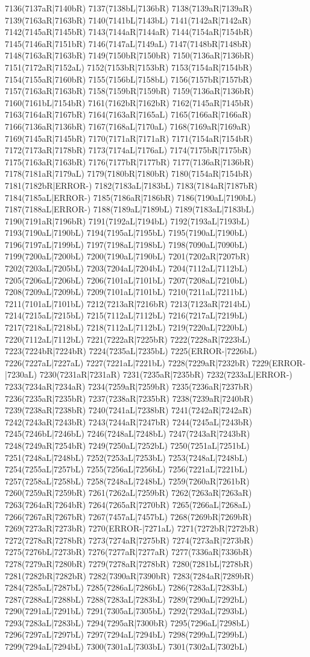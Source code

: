 7136(7137aR|7140bR) 7137(7138bL|7136bR) 7138(7139aR|7139aR) 7139(7163aR|7163bR) 7140(7141bL|7143bL) 7141(7142aR|7142aR) 7142(7145aR|7145bR) 7143(7144aR|7144aR) 7144(7154aR|7154bR) 7145(7146aR|7151bR) 7146(7147aL|7149aL) 7147(7148bR|7148bR) 7148(7163aR|7163bR) 7149(7150bR|7150bR) 7150(7136aR|7136bR) 7151(7172aR|7152aL) 7152(7153bR|7153bR) 7153(7154aR|7154bR) 7154(7155aR|7160bR) 7155(7156bL|7158bL) 7156(7157bR|7157bR) 7157(7163aR|7163bR) 7158(7159bR|7159bR) 7159(7136aR|7136bR) 7160(7161bL|7154bR) 7161(7162bR|7162bR) 7162(7145aR|7145bR) 7163(7164aR|7167bR) 7164(7163aR|7165aL) 7165(7166aR|7166aR) 7166(7136aR|7136bR) 7167(7168aL|7170aL) 7168(7169aR|7169aR) 7169(7145aR|7145bR) 7170(7171aR|7171aR) 7171(7154aR|7154bR) 7172(7173aR|7178bR) 7173(7174aL|7176aL) 7174(7175bR|7175bR) 7175(7163aR|7163bR) 7176(7177bR|7177bR) 7177(7136aR|7136bR) 7178(7181aR|7179aL) 7179(7180bR|7180bR) 7180(7154aR|7154bR) 7181(7182bR|ERROR-) 7182(7183aL|7183bL) 7183(7184aR|7187bR) 7184(7185aL|ERROR-) 7185(7186aR|7186bR) 7186(7190aL|7190bL) 7187(7188aL|ERROR-) 7188(7189aL|7189bL) 7189(7183aL|7183bL) 7190(7191aR|7196bR) 7191(7192aL|7194bL) 7192(7193aL|7193bL) 7193(7190aL|7190bL) 7194(7195aL|7195bL) 7195(7190aL|7190bL) 7196(7197aL|7199bL) 7197(7198aL|7198bL) 7198(7090aL|7090bL) 7199(7200aL|7200bL) 7200(7190aL|7190bL) 7201(7202aR|7207bR) 7202(7203aL|7205bL) 7203(7204aL|7204bL) 7204(7112aL|7112bL) 7205(7206aL|7206bL) 7206(7101aL|7101bL) 7207(7208aL|7210bL) 7208(7209aL|7209bL) 7209(7101aL|7101bL) 7210(7211aL|7211bL) 7211(7101aL|7101bL) 7212(7213aR|7216bR) 7213(7123aR|7214bL) 7214(7215aL|7215bL) 7215(7112aL|7112bL) 7216(7217aL|7219bL) 7217(7218aL|7218bL) 7218(7112aL|7112bL) 7219(7220aL|7220bL) 7220(7112aL|7112bL) 7221(7222aR|7225bR) 7222(7228aR|7223bL) 7223(7224bR|7224bR) 7224(7235aL|7235bL) 7225(ERROR-|7226bL) 7226(7227aL|7227aL) 7227(7221aL|7221bL) 7228(7229aR|7232bR) 7229(ERROR-|7230aL) 7230(7231aR|7231aR) 7231(7235aR|7235bR) 7232(7233aL|ERROR-) 7233(7234aR|7234aR) 7234(7259aR|7259bR) 7235(7236aR|7237bR) 7236(7235aR|7235bR) 7237(7238aR|7235bR) 7238(7239aR|7240bR) 7239(7238aR|7238bR) 7240(7241aL|7238bR) 7241(7242aR|7242aR) 7242(7243aR|7243bR) 7243(7244aR|7247bR) 7244(7245aL|7243bR) 7245(7246bL|7246bL) 7246(7248aL|7248bL) 7247(7243aR|7243bR) 7248(7249aR|7254bR) 7249(7250aL|7252bL) 7250(7251aL|7251bL) 7251(7248aL|7248bL) 7252(7253aL|7253bL) 7253(7248aL|7248bL) 7254(7255aL|7257bL) 7255(7256aL|7256bL) 7256(7221aL|7221bL) 7257(7258aL|7258bL) 7258(7248aL|7248bL) 7259(7260aR|7261bR) 7260(7259aR|7259bR) 7261(7262aL|7259bR) 7262(7263aR|7263aR) 7263(7264aR|7264bR) 7264(7265aR|7270bR) 7265(7266aL|7268aL) 7266(7267aR|7267bR) 7267(7457aL|7457bL) 7268(7269bR|7269bR) 7269(7273aR|7273bR) 7270(ERROR-|7271aL) 7271(7272bR|7272bR) 7272(7278aR|7278bR) 7273(7274aR|7275bR) 7274(7273aR|7273bR) 7275(7276bL|7273bR) 7276(7277aR|7277aR) 7277(7336aR|7336bR) 7278(7279aR|7280bR) 7279(7278aR|7278bR) 7280(7281bL|7278bR) 7281(7282bR|7282bR) 7282(7390aR|7390bR) 7283(7284aR|7289bR) 7284(7285aL|7287bL) 7285(7286aL|7286bL) 7286(7283aL|7283bL) 7287(7288aL|7288bL) 7288(7283aL|7283bL) 7289(7290aL|7292bL) 7290(7291aL|7291bL) 7291(7305aL|7305bL) 7292(7293aL|7293bL) 7293(7283aL|7283bL) 7294(7295aR|7300bR) 7295(7296aL|7298bL) 7296(7297aL|7297bL) 7297(7294aL|7294bL) 7298(7299aL|7299bL) 7299(7294aL|7294bL) 7300(7301aL|7303bL) 7301(7302aL|7302bL) 